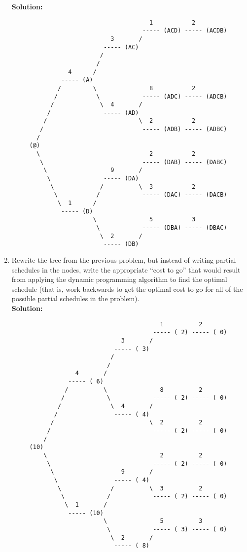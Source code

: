 \documentclass[11pts]{article}
\begin{document}
\begin{enumerate}
        \textbf{Solution:}
          \begin{verbatim}
                                       1           2
                                     ----- (ACD) ----- (ACDB)
                            3       /
                          ----- (AC)
                         /
                        / 
                4      /
              ----- (A)       
             /         \               8           2
            /           \            ----- (ADC) ----- (ADCB)
           /             \  4       /
          /               ----- (AD)
         /                          \  2           2
        /                            ----- (ADB) ----- (ADBC)
       /
     (@)
       \                               2           2
        \                            ----- (DAB) ----- (DABC)
         \                  9       /
          \               ----- (DA)
           \             /          \  3           2
            \           /            ----- (DAC) ----- (DACB)
             \  1      /
              ----- (D)
                       \               5           3
                        \            ----- (DBA) ----- (DBAC)
                         \  2       /
                          ----- (DB)
          \end{verbatim}
\newpage
  \item Rewrite the tree from the previous problem, but instead of
        writing partial schedules in the nodes, write the appropriate
        “cost to go” that would result from applying the dynamic
        programming algorithm to find the optimal schedule (that is,
        work backwards to get the optimal cost to go for all of the possible
        partial schedules in the problem). \\

        \textbf{Solution:}
          \begin{verbatim}
                                          1          2
                                        ----- ( 2) ----- ( 0)
                               3       /
                             ----- ( 3)
                            /
                           / 
                  4       /
                ----- ( 6)       
               /          \               8          2
              /            \            ----- ( 2) ----- ( 0)
             /              \  4       /
            /                ----- ( 4)
           /                           \  2          2
          /                             ----- ( 2) ----- ( 0)
         /
     (10)
         \                                2          2
          \                             ----- ( 2) ----- ( 0)
           \                   9       /
            \                ----- ( 4)
             \              /          \  3          2
              \            /            ----- ( 2) ----- ( 0)
               \  1       /
                ----- (10)
                          \               5          3
                           \            ----- ( 3) ----- ( 0)
                            \  2       /
                             ----- ( 8)
          \end{verbatim}


\end{enumerate}
\end{document}
